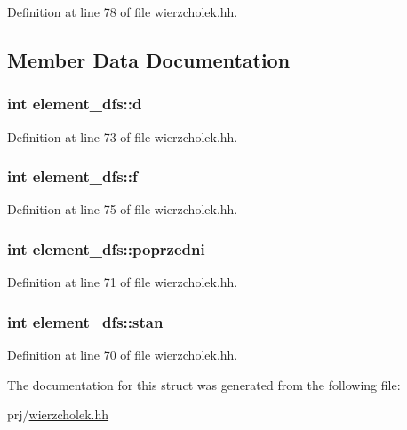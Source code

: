 \-Definition at line 78 of file wierzcholek.\-hh.



\subsection{\-Member \-Data \-Documentation}
\hypertarget{structelement__dfs_ae2d3c82805dc8b9b24a7dc1511c283dd}{
\subsubsection[{d}]{\setlength{\rightskip}{0pt plus 5cm}int {\bf element\-\_\-dfs\-::d}}}\label{structelement__dfs_ae2d3c82805dc8b9b24a7dc1511c283dd}


\-Definition at line 73 of file wierzcholek.\-hh.

\hypertarget{structelement__dfs_a9a75ad927680701485941a4e42b36290}{
\subsubsection[{f}]{\setlength{\rightskip}{0pt plus 5cm}int {\bf element\-\_\-dfs\-::f}}}\label{structelement__dfs_a9a75ad927680701485941a4e42b36290}


\-Definition at line 75 of file wierzcholek.\-hh.

\hypertarget{structelement__dfs_af3205a446fe8c834532d3b5de81deefa}{
\subsubsection[{poprzedni}]{\setlength{\rightskip}{0pt plus 5cm}int {\bf element\-\_\-dfs\-::poprzedni}}}\label{structelement__dfs_af3205a446fe8c834532d3b5de81deefa}


\-Definition at line 71 of file wierzcholek.\-hh.

\hypertarget{structelement__dfs_a48b8257c62eb0f4c52e10bf2c06fffda}{
\subsubsection[{stan}]{\setlength{\rightskip}{0pt plus 5cm}int {\bf element\-\_\-dfs\-::stan}}}\label{structelement__dfs_a48b8257c62eb0f4c52e10bf2c06fffda}


\-Definition at line 70 of file wierzcholek.\-hh.



\-The documentation for this struct was generated from the following file\-:\begin{DoxyCompactItemize}
\item 
prj/\hyperlink{wierzcholek_8hh}{wierzcholek.\-hh}\end{DoxyCompactItemize}
